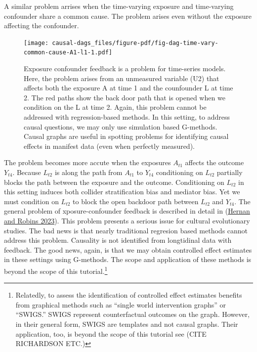 \documentclass[
  singlecolumn]{report}
\begin{document}
A similar problem arrises when the time-varying exposure and
time-varying confounder share a common cause. The problem arises even
without the exposure affecting the confounder.

\begin{figure}

{\centering \texttt{[image: causal-dags\_files/figure-pdf/fig-dag-time-vary-common-cause-A1-l1-1.pdf]}

}

\caption{\label{fig-dag-time-vary-common-cause-A1-l1}Exposure confounder
feedback is a problem for time-series models. Here, the problem arises
from an unmeasured variable (U2) that affects both the exposure A at
time 1 and the counfounder L at time 2. The red paths show the back door
path that is opened when we condition on the L at time 2. Again, this
problem cannot be addressed with regression-based methods. In this
setting, to address causal questions, we may only use simulation based
G-methods. Causal graphs are useful in spotting problems for identifying
causal effects in manifest data (even when perfectly measured).}

\end{figure}

The problem becomes more accute when the exposures \(A_{t1}\) affects
the outcome \(Y_{t4}\). Because \(L_{t2}\) is along the path from
\(A_{t1}\) to \(Y_{t4}\) conditioning on \(L_{t2}\) partially blocks the
path between the exposure and the outcome. Conditioning on \(L_{t2}\) in
this setting induces both collider stratification bias and mediator
bias. Yet we must condition on \(L_{t2}\) to block the open backdoor
path between \(L_{t2}\) and \(Y_{t4}\). The general problem of
xposure-confounder feedback is described in detail in
(\protect\hyperlink{ref-hernan2023}{Hernan and Robins 2023}). This
problem presents a serious issue for cultural evolutionary studies. The
bad news is that nearly traditional regresion based methods cannot
address this problem. Causality is not identified from longtidinal data
with feedback. The good news, again, is that we may obtain controlled
effect estimates in these settings using G-methods. The scope and
application of these methods is beyond the scope of this
tutorial.\footnote{Relatedly, to assess the identification of controlled
  effect estimates benefits from graphical methods such as ``single
  world intervention graphs'' or ``SWIGS.'' SWIGS represent
  counterfactual outcomes on the graph. However, in their general form,
  SWIGS are templates and not causal graphs. Their application, too, is
  beyond the scope of this tutorial see (CITE RICHARDSON ETC.)}
\end{document}
